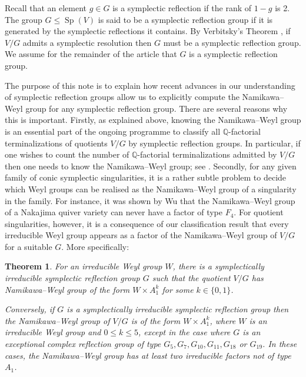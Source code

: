 \documentclass[a4paper]{amsart}
\theoremstyle{plain}
\newtheorem{theorem}{Theorem}[section]
\theoremstyle{definition}
\theoremstyle{remark}
\DeclareMathOperator{\Sp}{Sp}
\newcommand{\QQ}{\mathbb Q}
\begin{document}
Recall that an element $g \in G$ is a symplectic reflection if the rank of $1 - g$ is 2. The group $G \leqslant \Sp(V)$ is said to be a symplectic reflection group if it is generated by the symplectic reflections it contains. By Verbitsky's Theorem \cite{Ver00}, if $V/G$ admits a symplectic resolution then $G$ must be a symplectic reflection group. We assume for the remainder of the article that $G$ is a symplectic reflection group. 

The purpose of this note is to explain how recent advances in our understanding of symplectic reflection groups  \cite{GRS25,RS26} allow us to explicitly compute the Namikawa--Weyl group for any symplectic reflection group.
There are several reasons why this is important.
Firstly, as explained above, knowing the Namikawa--Weyl group is an essential part of the ongoing programme to classify all $\QQ$-factorial terminalizations of quotients $V/G$ by symplectic reflection groups.
In particular, if one wishes to count the number of $\QQ$-factorial terminalizations admitted by $V/G$ then one needs to know the Namikawa--Weyl group; see \cite{Bel16}.
Secondly, for any given family of conic symplectic singularities, it is a rather subtle problem to decide which Weyl groups can be realised as the Namikawa--Weyl group of a singularity in the family.
For instance, it was shown by Wu \cite[Thm.~1.14]{Wu23} that the Namikawa--Weyl group of a Nakajima quiver variety can never have a factor of type $F_4$.
For quotient singularities, however, it is a consequence of our classification result that every irreducible Weyl group appears as a factor of the Namikawa--Weyl group of \(V/G\) for a suitable \(G\).
More specifically:

\begin{theorem}
  For an irreducible Weyl group \(W\), there is a symplectically irreducible symplectic reflection group \(G\) such that the quotient \(V/G\) has Namikawa--Weyl group of the form \(W\times A_1^k\) for some \(k\in\{0, 1\}\).

  Conversely, if $G$ is a symplectically irreducible symplectic reflection group then the Namikawa--Weyl group of $V/G$ is of the form $W \times A_1^k$, where $W$ is an irreducible Weyl group and $0 \leqslant k \leqslant 5$, except in the case where $G$ is an exceptional complex reflection group of type $G_5, G_7, G_{10}, G_{11}, G_{18}$ or $G_{19}$.
  In these cases, the Namikawa--Weyl group has at least two irreducible factors not of type $A_1$.
\end{theorem}
\end{document}
